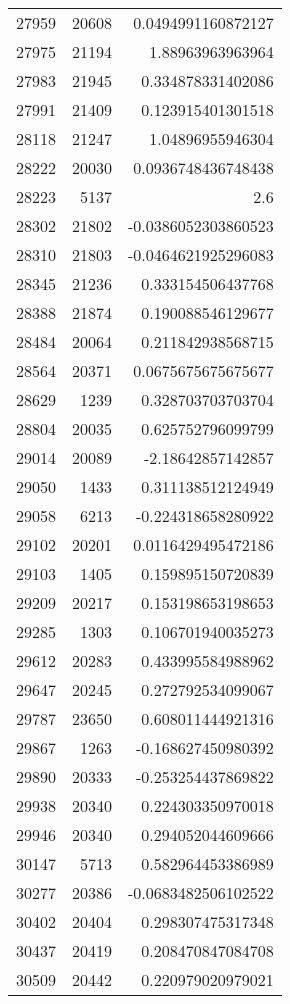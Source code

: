 \begin{tabular}{r | r | r}
27959 & 20608 & 0.0494991160872127 \\
27975 & 21194 & 1.88963963963964 \\
27983 & 21945 & 0.334878331402086 \\
27991 & 21409 & 0.123915401301518 \\
28118 & 21247 & 1.04896955946304 \\
28222 & 20030 & 0.0936748436748438 \\
28223 & 5137 & 2.6 \\
28302 & 21802 & -0.0386052303860523 \\
28310 & 21803 & -0.0464621925296083 \\
28345 & 21236 & 0.333154506437768 \\
28388 & 21874 & 0.190088546129677 \\
28484 & 20064 & 0.211842938568715 \\
28564 & 20371 & 0.0675675675675677 \\
28629 & 1239 & 0.328703703703704 \\
28804 & 20035 & 0.625752796099799 \\
29014 & 20089 & -2.18642857142857 \\
29050 & 1433 & 0.311138512124949 \\
29058 & 6213 & -0.224318658280922 \\
29102 & 20201 & 0.0116429495472186 \\
29103 & 1405 & 0.159895150720839 \\
29209 & 20217 & 0.153198653198653 \\
29285 & 1303 & 0.106701940035273 \\
29612 & 20283 & 0.433995584988962 \\
29647 & 20245 & 0.272792534099067 \\
29787 & 23650 & 0.608011444921316 \\
29867 & 1263 & -0.168627450980392 \\
29890 & 20333 & -0.253254437869822 \\
29938 & 20340 & 0.224303350970018 \\
29946 & 20340 & 0.294052044609666 \\
30147 & 5713 & 0.582964453386989 \\
30277 & 20386 & -0.0683482506102522 \\
30402 & 20404 & 0.298307475317348 \\
30437 & 20419 & 0.208470847084708 \\
30509 & 20442 & 0.220979020979021 \\

\end{tabular}
